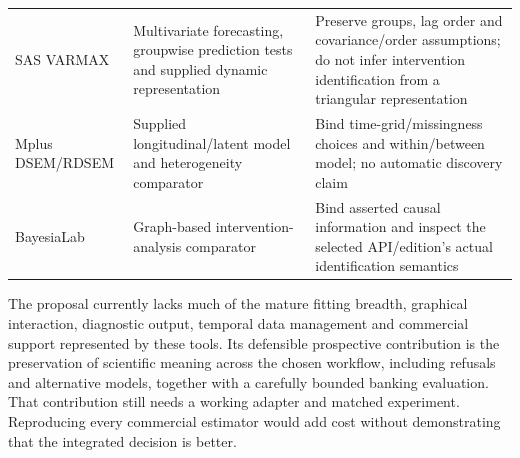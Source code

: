 \begin{longtable}[]{@{}lll@{}}
\begin{minipage}[t]{0.30\columnwidth}
SAS VARMAX\strut
\end{minipage} & \begin{minipage}[t]{0.30\columnwidth}\raggedright
Multivariate forecasting, groupwise prediction tests and supplied
dynamic representation\strut
\end{minipage} & \begin{minipage}[t]{0.30\columnwidth}\raggedright
Preserve groups, lag order and covariance/order assumptions; do not
infer intervention identification from a triangular representation\strut
\end{minipage}\tabularnewline
\begin{minipage}[t]{0.30\columnwidth}\raggedright
Mplus DSEM/RDSEM\strut
\end{minipage} & \begin{minipage}[t]{0.30\columnwidth}\raggedright
Supplied longitudinal/latent model and heterogeneity comparator\strut
\end{minipage} & \begin{minipage}[t]{0.30\columnwidth}\raggedright
Bind time-grid/missingness choices and within/between model; no
automatic discovery claim\strut
\end{minipage}\tabularnewline
\begin{minipage}[t]{0.30\columnwidth}\raggedright
BayesiaLab\strut
\end{minipage} & \begin{minipage}[t]{0.30\columnwidth}\raggedright
Graph-based intervention-analysis comparator\strut
\end{minipage} & \begin{minipage}[t]{0.30\columnwidth}\raggedright
Bind asserted causal information and inspect the selected API/edition's
actual identification semantics\strut
\end{minipage}\tabularnewline
\bottomrule
\end{longtable}

The proposal currently lacks much of the mature fitting breadth,
graphical interaction, diagnostic output, temporal data management and
commercial support represented by these tools. Its defensible
prospective contribution is the preservation of scientific meaning
across the chosen workflow, including refusals and alternative models,
together with a carefully bounded banking evaluation. That contribution
still needs a working adapter and matched experiment. Reproducing every
commercial estimator would add cost without demonstrating that the
integrated decision is better.

